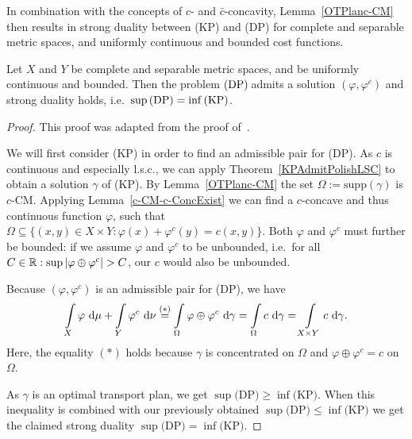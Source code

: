In combination with the concepts of $c$- and $\bar{c}$-concavity, Lemma~\ref{OTPlanc-CM} then results in strong duality between (KP) and (DP) for complete and separable metric spaces, and uniformly continuous and bounded cost functions.

\begin{theorem}\label{BoundedPDRel}
	Let $X$ and $Y$ be complete and separable metric spaces, and  be uniformly continuous and bounded. Then the problem$\text{\normalfont\ (DP)\,}$admits a solution $(\varphi, \varphi^c)$ and strong duality holds, i.e.\ $\sup \!\text{\normalfont\,(DP)} = \inf \!\text{\normalfont\,(KP)}$.
\end{theorem}

\begin{proof}
	This proof was adapted from the proof of\ \cite[Theorem~1.39]{San2015}.

	We will first consider (KP) in order to find an admissible pair for (DP). As $c$ is continuous and especially l.s.c., we can apply Theorem~\ref{KPAdmitPolishLSC} to obtain a solution $\gamma$ of (KP). By Lemma~\ref{OTPlanc-CM} the set $\Omega := \text{supp}(\gamma)$ is $c$-CM\@. Applying Lemma~\ref{c-CM-c-ConcExist} we can find a $c$-concave and thus continuous function $\varphi$, such that $\Omega \subseteq \big\{ (x, y) \in X \times Y : \varphi(x) + \varphi^c(y) = c(x, y) \big\}$. Both $\varphi$ and $\varphi^c$ must further be bounded: if we assume $\varphi$ and $\varphi^c$ to be unbounded, i.e.~for all $C \in \R: \sup \vert \varphi \oplus \varphi^c \vert > C$, our $c$ would also be unbounded.
	
	Because $(\varphi, \varphi^c)$ is an admissible pair for (DP), we have
	\[ \int\limits_X \varphi~\D + \int\limits_Y \varphi^c~\D[\nu] \overset{(*)}{=} \int\limits_{\Omega} \varphi \oplus \varphi^c~\D[\gamma]  = \int\limits_{\Omega} c~\D[\gamma] = \int\limits_{X \times Y} c~\D[\gamma]. \]
	Here, the equality $(*)$ holds because $\gamma$ is concentrated on $\Omega$ and $\varphi \oplus \varphi^c = c$ on $\Omega$.

	As $\gamma$ is an optimal transport plan, we get $\sup \text{(DP)} \ge \inf \text{(KP)}$. When this inequality is combined with our previously obtained $\sup \text{(DP)} \le \inf \text{(KP)}$ we get the claimed strong duality $\sup \text{(DP)} = \inf \text{(KP)}$.
\end{proof}


